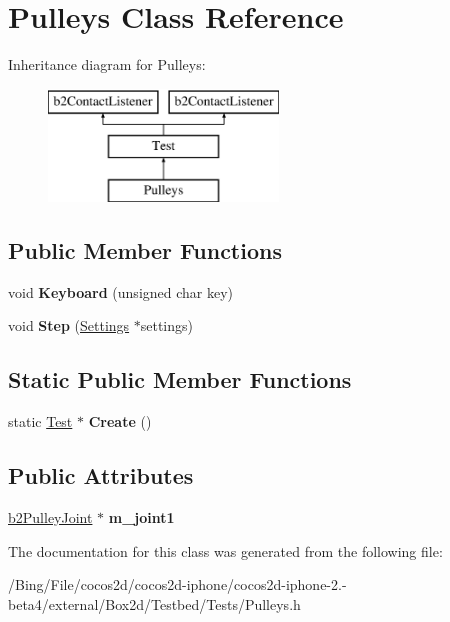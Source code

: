 \hypertarget{class_pulleys}{\section{Pulleys Class Reference}
\label{class_pulleys}
}
Inheritance diagram for Pulleys\-:\begin{figure}[H]
\begin{center}
\leavevmode
\includegraphics[height=3.000000cm]{class_pulleys}
\end{center}
\end{figure}
\subsection*{Public Member Functions}
\begin{DoxyCompactItemize}
\item 
\hypertarget{class_pulleys_ae86c706d55f311bde691c6f6cec841c8}{void {\bfseries Keyboard} (unsigned char key)}\label{class_pulleys_ae86c706d55f311bde691c6f6cec841c8}

\item 
\hypertarget{class_pulleys_a6efc8aaa379ef205bed847f19fe3dc84}{void {\bfseries Step} (\hyperlink{struct_settings}{Settings} $\ast$settings)}\label{class_pulleys_a6efc8aaa379ef205bed847f19fe3dc84}

\end{DoxyCompactItemize}
\subsection*{Static Public Member Functions}
\begin{DoxyCompactItemize}
\item 
\hypertarget{class_pulleys_adf71f8468aebb0d5c2149309eae1618b}{static \hyperlink{class_test}{Test} $\ast$ {\bfseries Create} ()}\label{class_pulleys_adf71f8468aebb0d5c2149309eae1618b}

\end{DoxyCompactItemize}
\subsection*{Public Attributes}
\begin{DoxyCompactItemize}
\item 
\hypertarget{class_pulleys_abab94f862c5210aaf6951d823b10fce8}{\hyperlink{classb2_pulley_joint}{b2\-Pulley\-Joint} $\ast$ {\bfseries m\-\_\-joint1}}\label{class_pulleys_abab94f862c5210aaf6951d823b10fce8}

\end{DoxyCompactItemize}


The documentation for this class was generated from the following file\-:\begin{DoxyCompactItemize}
\item 
/\-Bing/\-File/cocos2d/cocos2d-\/iphone/cocos2d-\/iphone-\/2.-\/beta4/external/\-Box2d/\-Testbed/\-Tests/Pulleys.\-h\end{DoxyCompactItemize}
